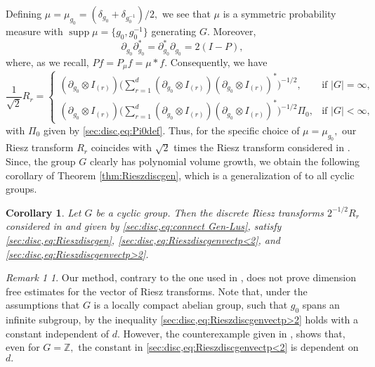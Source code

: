 \documentclass[leqno,12pt]{amsart}
\newtheorem{cor}[thm]{Corollary}
\theoremstyle{definition}
\theoremstyle{remark}
\newtheorem*{remark1}{Remark 1}
\begin{document}
Defining $\mu=\mu_{g_0}=(\delta_{g_0}+\delta_{g_0^{-1}})/2,$ we see that $\mu$ is a symmetric probability measure with $\operatorname{supp} \mu=\{g_0,g_0^{-1}\}$ generating $G.$ Moreover, \begin{equation*} \partial_{g_0}\partial_{g_0}^{*}=\partial_{g_0}^*\partial_{g_0}=2(I-P),\end{equation*} where, as we recall, $Pf=P_{\mu}f=\mu*f.$ Consequently, we have
\begin{equation}\label{sec:disc,eq:connect Gen-Lus}
\frac{1}{\sqrt{2}}R_r=\left\{ \begin{array}{lr}
 (\partial_{g_0}\otimes I_{(r)})\big(\sum_{r=1}^d (\partial_{g_0}\otimes I_{(r)})(\partial_{g_0}\otimes I_{(r)})^{*}\big)^{-1/2}, &\mbox{if $|G|=\infty$}, \\
(\partial_{g_0}\otimes I_{(r)})\big(\sum_{r=1}^d (\partial_{g_0}\otimes I_{(r)})(\partial_{g_0}\otimes I_{(r)})^{*}\big)^{-1/2}\Pi_0, &\mbox{if $|G|<\infty,$}
       \end{array} \right.
\end{equation}
with $\Pi_0$ given by \eqref{sec:disc,eq:Pi0def}. Thus, for the specific choice of $\mu=\mu_{g_0},$ our Riesz transform $R_r$ coincides with $\sqrt{2}$ times the Riesz transform considered in \cite[p.\ 307]{Lu_Piqu1}. Since, the group $G$ clearly has polynomial volume growth, we obtain the following corollary of Theorem \ref{thm:Rieszdiscgen}, which is a generalization of \cite[Theorem 2.8]{Lu_Piqu1} to all cyclic groups.
\begin{cor}
\label{cor:RieszgenLu_Piqu}
Let $G$ be a cyclic group. Then the discrete Riesz transforms $2^{-1/2}R_r$ considered in \cite{Lu_Piqu1} and given by \eqref{sec:disc,eq:connect Gen-Lus}, satisfy \eqref{sec:disc,eq:Rieszdiscgen}, \eqref{sec:disc,eq:Rieszdiscgenvectp<2}, and \eqref{sec:disc,eq:Rieszdiscgenvectp>2}.
\end{cor}
\begin{remark1}
Our method, contrary to the one used in \cite{Lu_Piqu1}, does not prove dimension free estimates for the vector of Riesz transforms. Note that, under the assumptions that $G$ is a locally compact abelian group, such that $g_0$ spans an infinite subgroup, by \cite[Theorem 2.8]{Lu_Piqu1} the inequality \eqref{sec:disc,eq:Rieszdiscgenvectp>2} holds with a constant independent of $d.$ However, the counterexample given in \cite[Proposition 2.9]{Lu_Piqu1}, shows that, even for $G=\mathbb{Z},$ the constant in \eqref{sec:disc,eq:Rieszdiscgenvectp<2} is dependent on $d.$
\end{remark1}
\end{document}
